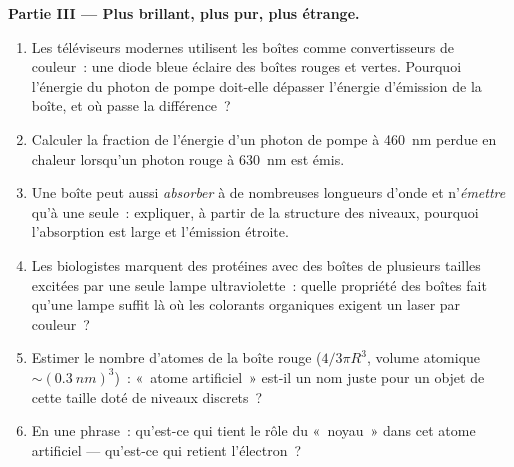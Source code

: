 \begin{problem}
\medskip\noindent\textbf{Partie III --- Plus brillant, plus pur, plus étrange.}
\begin{enumerate}[resume]
  \item Les téléviseurs modernes utilisent les boîtes comme
        convertisseurs de couleur~: une diode bleue éclaire des boîtes
        rouges et vertes. Pourquoi l'énergie du photon de pompe
        doit-elle dépasser l'énergie d'émission de la boîte, et où passe
        la différence~?
  \item Calculer la fraction de l'énergie d'un photon de pompe à
        \qty{460}{nm} perdue en chaleur lorsqu'un photon rouge à
        \qty{630}{nm} est émis.
  \item Une boîte peut aussi \emph{absorber} à de nombreuses longueurs
        d'onde et n'\emph{émettre} qu'à une seule~: expliquer, à partir
        de la structure des niveaux, pourquoi l'absorption est large et
        l'émission étroite.
  \item Les biologistes marquent des protéines avec des boîtes de
        plusieurs tailles excitées par une seule lampe ultraviolette~:
        quelle propriété des boîtes fait qu'une lampe suffit là où les
        colorants organiques exigent un laser par couleur~?
  \item Estimer le nombre d'atomes de la boîte rouge ($4/3\pi R^3$,
        volume atomique $\sim(\qty{0.3}{nm})^3$)~: «~atome
        artificiel~» est-il un nom juste pour un objet de cette taille
        doté de niveaux discrets~?
  \item En une phrase~: qu'est-ce qui tient le rôle du «~noyau~» dans
        cet atome artificiel --- qu'est-ce qui retient l'électron~?
\end{enumerate}


\end{problem}
